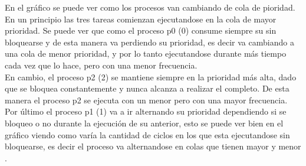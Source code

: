 En el gr\'afico se puede ver como los procesos van cambiando de cola de pioridad. En un principio las tres tareas comienzan ejecutandose en la cola de mayor prioridad. Se puede ver que como el proceso p0 (0) consume siempre su \quantum sin bloquearse  y de esta manera va perdiendo su prioridad, es decir va cambiando a una cola de menor prioridad, y por lo tanto ejecutandose durante m\'as tiempo cada vez que lo hace, pero con una menor frecuencia.\\
En cambio, el proceso p2 (2) se mantiene siempre en la prioridad m\'as alta, dado que se bloquea constantemente y nunca alcanza a realizar el \quantum completo. De esta manera el proceso p2 se ejecuta con un \quantum menor pero con una mayor frecuencia.\\
Por \'ultimo el proceso p1 (1) va a ir alternando su prioridad dependiendo si se bloqueo o no durante la ejecuci\'on de su \quantum anterior, esto se puede ver bien en el gr\'afico viendo como var\'ia la cantidad de ciclos en los que esta ejecutandose sin bloquearse, es decir el proceso va alternandose en colas que tienen mayor y menor \quantum.